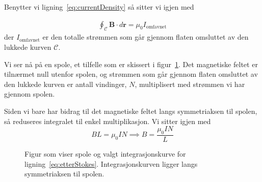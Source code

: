 \documentclass[a4paper,11pt, twocolumn]{article}
\begin{document}
Benytter vi ligning~\eqref{eq:currentDensity} så sitter vi igjen med 

\begin{align}
	\oint_\mathcal{C}\mathbf{B}\cdot d\mathbf{r}=\mu_0 I_\text{omfavnet}
	\label{eq:etterStokes}
\end{align}
der $I_\text{omfavnet}$ er den totalle strømmen som går gjennom flaten omsluttet av den lukkede kurven $\mathcal{C}$.

Vi ser nå på en spole, et tilfelle som er skissert i figur~\ref{fig:spole}. Det magnetiske feltet er tilnærmet null utenfor spolen, og strømmen som går gjennom flaten omsluttet av den lukkede kurven er antall vindinger, $N$, multiplisert med strømmen vi har gjennom spolen.

Siden vi bare har bidrag til det magnetiske feltet langs symmetriaksen til spolen, så reduseres integralet til enkel multiplikasjon. Vi sitter igjen med
\begin{equation}
	BL = \mu_0IN \implies B = \frac{\mu_0 I N}{L}
	\label{eq:magSpole}
\end{equation}

\begin{figure}[!ht]
	\centering

	\caption{Figur som viser spole og valgt integrasjonskurve for ligning~\ref{eq:etterStokes}. Integrasjonskurven ligger langs symmetriaksen til spolen.} 
	\label{fig:spole}
\end{figure}
\end{document}
